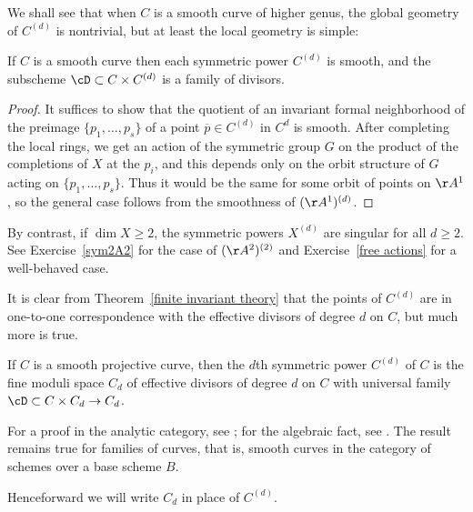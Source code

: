 We shall see that when $C$ is a smooth curve of higher genus, the global geometry of $C^{(d)}$ is nontrivial, but at least the local geometry is simple:

\begin{proposition}
If $C$ is a smooth curve then each symmetric power $C^{(d)}$ is smooth, and the subscheme
$\cD \subset C\times C^{(d)}$ is a family of divisors.
\end{proposition}

\begin{proof}
It suffices to
 show that the quotient of an invariant formal neighborhood of the preimage $\{p_1,\dots, p_s\}$ of a point
 $\overline p\in C^{(d)}$ in $C^d$  is smooth. After completing the local rings, we get an action of the symmetric group
 $G$ on the product of the completions of $X$ at the $p_i$, and this depends only on the orbit
 structure of $G$ acting on $\{p_1,\dots, p_s\}$. Thus it would be the same for some orbit of
 points on $\AA^1$, so the general case follows from the smoothness of $(\AA^{1})^{(d)}$.
 \end{proof}

By contrast, if $\dim X \geq 2$, the symmetric powers $X^{(d)}$ are singular for all $d \geq 2$.
See Exercise~\ref{sym2A2} for the case of $(\AA^2)^{(2)}$ and Exercise~\ref{free actions} for a well-behaved case.

It is clear from Theorem~\ref{finite invariant theory} that the points of $C^{(d)}$ are in one-to-one correspondence with the effective divisors of
degree $d$ on $C$, but much more is true. 

\begin{fact}
\begin{theorem}
If $C$ is a smooth projective curve, then the $d$th symmetric power $C^{(d)}$ of $C$ is the fine moduli space $C_d$ of effective divisors of degree $d$ on $C$ with universal family $\cD\subset C\times C_d \to C_d$.
\end{theorem}
For a proof in the analytic category, see \cite[p. 164]{ACGH}; for the algebraic fact, see \cite[Remark 9.3.9]{Kleiman-PicardScheme}. The result remains true for families of curves, that is, smooth curves in the category of schemes over
a base scheme $B$.
\end{fact}

Henceforward we will write $C_d$ in place of $C^{(d)}$.



